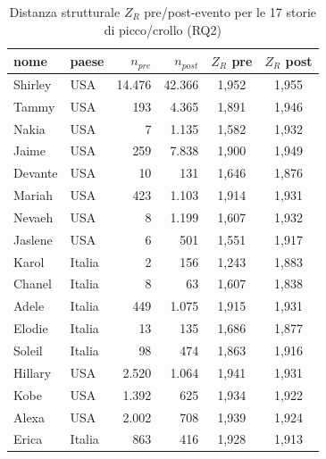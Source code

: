 \documentclass[conference]{IEEEtran}
\begin{document}
\begin{table}[t]
\centering
\footnotesize
\caption{Distanza strutturale $Z_R$ pre/post-evento per le 17 storie di picco/crollo (RQ2)}
\label{tab:rq2}
\begin{tabular}{l l r r c c}
\toprule
\textbf{nome} & \textbf{paese} & \textbf{$n_{pre}$} & \textbf{$n_{post}$} & \textbf{$Z_R$ pre} & \textbf{$Z_R$ post} \\
\midrule
Shirley  & USA     & 14.476 & 42.366 & 1,952 & 1,955 \\
Tammy    & USA     & 193    & 4.365  & 1,891 & 1,946 \\
Nakia    & USA     & 7      & 1.135  & 1,582 & 1,932 \\
Jaime    & USA     & 259    & 7.838  & 1,900 & 1,949 \\
Devante  & USA     & 10     & 131    & 1,646 & 1,876 \\
Mariah   & USA     & 423    & 1.103  & 1,914 & 1,931 \\
Nevaeh   & USA     & 8      & 1.199  & 1,607 & 1,932 \\
Jaslene  & USA     & 6      & 501    & 1,551 & 1,917 \\
Karol    & Italia  & 2      & 156    & 1,243 & 1,883 \\
Chanel   & Italia  & 8      & 63     & 1,607 & 1,838 \\
Adele    & Italia  & 449    & 1.075  & 1,915 & 1,931 \\
Elodie   & Italia  & 13     & 135    & 1,686 & 1,877 \\
Soleil   & Italia  & 98     & 474    & 1,863 & 1,916 \\
Hillary  & USA     & 2.520  & 1.064  & 1,941 & 1,931 \\
Kobe     & USA     & 1.392  & 625    & 1,934 & 1,922 \\
Alexa    & USA     & 2.002  & 708    & 1,939 & 1,924 \\
Erica    & Italia  & 863    & 416    & 1,928 & 1,913 \\
\bottomrule
\end{tabular}
\end{table}
\end{document}
